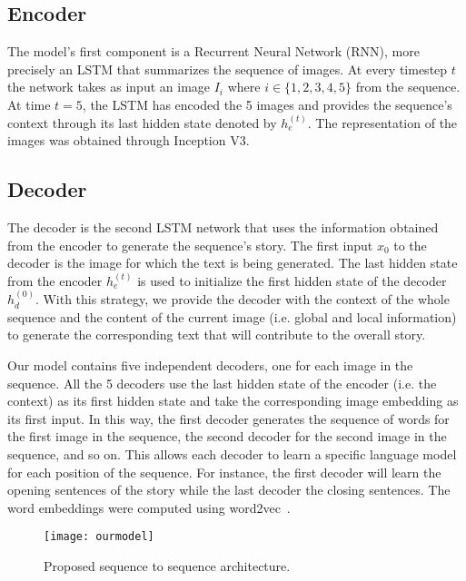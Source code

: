 \documentclass[11pt,a4paper]{article}
\begin{document}
\subsection{Encoder}

The model's first component is a Recurrent Neural Network (RNN), more precisely an LSTM that summarizes the sequence of images. At every timestep $t$ the network takes as input an image $I_i$ where $i\in\{1,2,3,4,5\}$ from the sequence. At time $t=5$, the LSTM has encoded the 5 images and provides the sequence's context through its last hidden state denoted by $h_e^{(t)}$. The representation of the images was obtained through Inception V3.

\subsection{Decoder}

The decoder is the second LSTM network that uses the information obtained from the encoder to generate the sequence's story.   
The first input $x_0$ to the decoder is the image for which the text is being generated. 
The last hidden state from the encoder $h_e^{(t)}$ is used to initialize the first hidden state of the decoder $h_d^{(0)}$. 
With this strategy, we provide the decoder with the context of the whole sequence and the content of the current image (i.e. global and local information) to generate the corresponding text that will contribute to the overall story. 

Our model contains five independent decoders, one for each image in the sequence. 
All the 5 decoders use the last hidden state of the encoder (i.e. the context) as its first hidden state and take the corresponding image embedding as its first input. 
In this way, the first decoder generates the sequence of words for the first image in the sequence, the second decoder for the second image in the sequence, and so on. 
This allows each decoder to learn a specific language model for each position of the sequence.
For instance, the first decoder will learn the opening sentences of the story while the last decoder the closing sentences.
The word embeddings were computed using word2vec~\cite{mikolov}.

\begin{figure*}[h!]
    \centering
    \texttt{[image: ourmodel]}
    \caption{Proposed sequence to sequence architecture.} 
    \label{fig:model}
\end{figure*}
\end{document}
